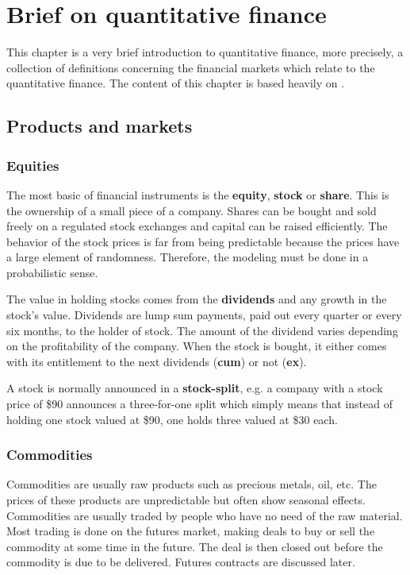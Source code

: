 \chapter{Brief on quantitative finance}
This chapter is a very brief introduction to quantitative finance, more precisely, a collection of definitions concerning the financial markets which relate to the quantitative finance. The content of this chapter is based heavily on \cite{pw_iqf2ed_2007, ch_ofd9ed_2015}.


\section{Products and markets}
\subsection{Equities}
The most basic of financial instruments is the  \textbf{equity}, \textbf{stock} or \textbf{share}. This is the ownership of a small piece of a company. Shares can be bought and sold freely on a regulated stock exchanges and capital can be raised efficiently. The behavior of the stock prices is far from being predictable because the prices have a large element of randomness. Therefore, the modeling must be done in a probabilistic sense. 

The value in holding stocks comes from the \textbf{dividends} and any growth in the stock's value. Dividends are lump sum payments, paid out every quarter or every six months, to the holder of stock. The amount of the dividend varies depending on the profitability of the company. When the stock is bought, it either comes with its entitlement to the next dividends (\textbf{cum}) or not (\textbf{ex}). 

A stock is normally announced in a \textbf{stock-split}, e.g. a company with a stock price of \$90 announces a three-for-one split which simply means that instead of holding one stock valued at \$90, one holds three valued at \$30 each.
 
 
\subsection{Commodities}
Commodities are usually raw products such as precious metals, oil, etc. The prices of these products are unpredictable but often show seasonal effects. Commodities are usually traded by people who have no need of the raw material. Most trading is done on the futures market, making deals to buy or sell the commodity at some time in the future. The deal is then closed out before the commodity is due to be delivered. Futures contracts are discussed later.


